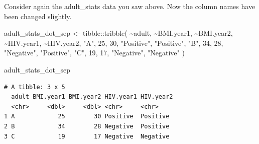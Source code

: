 \documentclass[
  letterpaper,
  DIV=11,
  numbers=noendperiod]{scrreprt}
\newenvironment{Shaded}{\begin{snugshade}}{\end{snugshade}}
\newcommand{\AttributeTok}[1]{\textcolor[rgb]{0.40,0.45,0.13}{#1}}
\newcommand{\DecValTok}[1]{\textcolor[rgb]{0.68,0.00,0.00}{#1}}
\newcommand{\FunctionTok}[1]{\textcolor[rgb]{0.28,0.35,0.67}{#1}}
\newcommand{\NormalTok}[1]{\textcolor[rgb]{0.00,0.23,0.31}{#1}}
\newcommand{\OtherTok}[1]{\textcolor[rgb]{0.00,0.23,0.31}{#1}}
\newcommand{\SpecialCharTok}[1]{\textcolor[rgb]{0.37,0.37,0.37}{#1}}
\newcommand{\StringTok}[1]{\textcolor[rgb]{0.13,0.47,0.30}{#1}}
\begin{document}
\begin{tcolorbox}[enhanced jigsaw, colframe=quarto-callout-tip-color-frame, rightrule=.15mm, opacityback=0, breakable, coltitle=black, colbacktitle=quarto-callout-tip-color!10!white, bottomrule=.15mm, leftrule=.75mm, toprule=.15mm, arc=.35mm, bottomtitle=1mm, colback=white, left=2mm, opacitybacktitle=0.6, titlerule=0mm, title=\textcolor{quarto-callout-tip-color}{\faLightbulb}\hspace{0.5em}{Practice}, toptitle=1mm]

Consider again the adult\_stats data you saw above. Now the column names
have been changed slightly.

\begin{Shaded}
\begin{Highlighting}[]
\NormalTok{adult\_stats\_dot\_sep }\OtherTok{\textless{}{-}} 
\NormalTok{  tibble}\SpecialCharTok{::}\FunctionTok{tribble}\NormalTok{(}
    \SpecialCharTok{\textasciitilde{}}\NormalTok{adult,  }\SpecialCharTok{\textasciitilde{}}\StringTok{\textasciigrave{}}\AttributeTok{BMI.year1}\StringTok{\textasciigrave{}}\NormalTok{,  }\SpecialCharTok{\textasciitilde{}}\StringTok{\textasciigrave{}}\AttributeTok{BMI.year2}\StringTok{\textasciigrave{}}\NormalTok{,  }\SpecialCharTok{\textasciitilde{}}\StringTok{\textasciigrave{}}\AttributeTok{HIV.year1}\StringTok{\textasciigrave{}}\NormalTok{,  }\SpecialCharTok{\textasciitilde{}}\StringTok{\textasciigrave{}}\AttributeTok{HIV.year2}\StringTok{\textasciigrave{}}\NormalTok{,}
       \StringTok{"A"}\NormalTok{,            }\DecValTok{25}\NormalTok{,            }\DecValTok{30}\NormalTok{,    }\StringTok{"Positive"}\NormalTok{,   }\StringTok{"Positive"}\NormalTok{,}
       \StringTok{"B"}\NormalTok{,            }\DecValTok{34}\NormalTok{,            }\DecValTok{28}\NormalTok{,    }\StringTok{"Negative"}\NormalTok{,   }\StringTok{"Positive"}\NormalTok{,}
       \StringTok{"C"}\NormalTok{,            }\DecValTok{19}\NormalTok{,            }\DecValTok{17}\NormalTok{,    }\StringTok{"Negative"}\NormalTok{,   }\StringTok{"Negative"}
\NormalTok{  )}


\NormalTok{adult\_stats\_dot\_sep}
\end{Highlighting}
\end{Shaded}

\begin{verbatim}
# A tibble: 3 x 5
  adult BMI.year1 BMI.year2 HIV.year1 HIV.year2
  <chr>     <dbl>     <dbl> <chr>     <chr>    
1 A            25        30 Positive  Positive 
2 B            34        28 Negative  Positive 
3 C            19        17 Negative  Negative 
\end{verbatim}


\end{tcolorbox}
\end{document}
